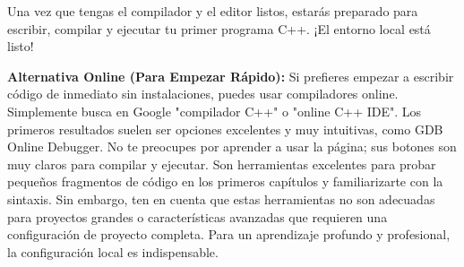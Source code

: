 Una vez que tengas el compilador y el editor listos, estarás preparado para escribir, compilar y ejecutar tu primer programa C++. ¡El entorno local está listo!

\textbf{Alternativa Online (Para Empezar Rápido):}
Si prefieres empezar a escribir código de inmediato sin instalaciones, puedes usar compiladores online. Simplemente busca en Google "compilador C++" o "online C++ IDE". Los primeros resultados suelen ser opciones excelentes y muy intuitivas, como GDB Online Debugger. No te preocupes por aprender a usar la página; sus botones son muy claros para compilar y ejecutar. Son herramientas excelentes para probar pequeños fragmentos de código en los primeros capítulos y familiarizarte con la sintaxis. Sin embargo, ten en cuenta que estas herramientas no son adecuadas para proyectos grandes o características avanzadas que requieren una configuración de proyecto completa. Para un aprendizaje profundo y profesional, la configuración local es indispensable.
